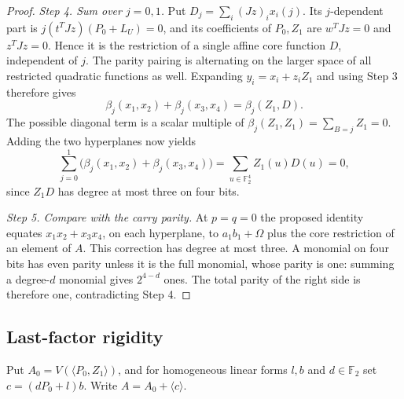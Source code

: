 \documentclass[11pt,a4paper]{article}
\theoremstyle{plain}
\theoremstyle{remark}
\theoremstyle{plain}
\newcommand{\F}{\mathbb F_2}
\begin{document}
\begin{proof}
\emph{Step 4. Sum over $j=0,1$.}
Put $D_j=\sum_i(Jz)_ix_i(j)$. Its $j$-dependent part is $j(t^TJz)(P_0+L_U)=0$, and its coefficients of $P_0,Z_1$ are $w^TJz=0$ and $z^TJz=0$. Hence it is the restriction of a single affine core function $D$, independent of $j$.
The parity pairing is alternating on the larger space of all restricted quadratic functions as well. Expanding $y_i=x_i+z_iZ_1$ and using Step 3 therefore gives
\[
\beta_j(x_1,x_2)+\beta_j(x_3,x_4)=\beta_j(Z_1,D).
\]
The possible diagonal term is a scalar multiple of $\beta_j(Z_1,Z_1)=\sum_{B=j}Z_1=0$. Adding the two hyperplanes now yields
\[
\sum_{j=0}^1\bigl(\beta_j(x_1,x_2)+\beta_j(x_3,x_4)\bigr)
=\sum_{u\in\F^4}Z_1(u)D(u)=0,
\]
since $Z_1D$ has degree at most three on four bits.

\emph{Step 5. Compare with the carry parity.}
At $p=q=0$ the proposed identity equates $x_1x_2+x_3x_4$, on each hyperplane, to $a_1b_1+\Omega$ plus the core restriction of an element of $A$. This correction has degree at most three. A monomial on four bits has even parity unless it is the full monomial, whose parity is one: summing a degree-$d$ monomial gives $2^{4-d}$ ones. The total parity of the right side is therefore one, contradicting Step 4.

\end{proof}

\subsection{Last-factor rigidity}

Put $A_0=V(\langle P_0,Z_1\rangle)$, and for homogeneous linear forms $l,b$ and $d\in\F$ set $c=(dP_0+l)b$. Write $A=A_0+\langle c\rangle$.
\end{document}
